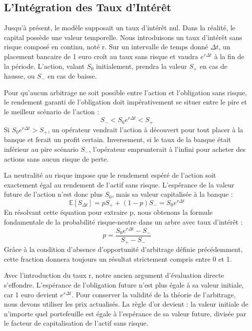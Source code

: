 \subsection{L'Intégration des Taux d'Intérêt}

Jusqu'à présent, le modèle supposait un taux d'intérêt nul. Dans la réalité, le capital possède une valeur temporelle. Nous introduisons un taux d'intérêt sans risque composé en continu, noté r. 
Sur un intervalle de temps donné $\Delta t$, un placement bancaire de 1 euro croît au taux sans risque et vaudra $e^{r\Delta t}$ à la fin de la période. 
L'action, valant $S_0$ initialement, prendra la valeur $S_+$ en cas de hausse, ou $S_-$ en cas de baisse.

Pour qu'aucun arbitrage ne soit possible entre l'action et l'obligation sans risque, le rendement garanti de l'obligation doit impérativement se situer entre le pire et le meilleur scénario de l'action :
\begin{equation}
    \label{eq:fsec3-aoa_taux}
    S_- < S_0 e^{r\Delta t} < S_+
\end{equation}
Si $S_0 e^{r\Delta t} > S_+$, un opérateur vendrait l'action à découvert pour tout placer à la banque et ferait un profit certain. Inversement, si le taux de la banque était inférieur au pire scénario $S_-$, l'opérateur emprunterait à l'infini pour acheter des actions sans aucun risque de perte.

La neutralité au risque impose que le rendement espéré de l'action soit exactement égal au rendement de l'actif sans risque. L'espérance de la valeur future de l'action n'est donc plus $S_0$, mais sa valeur capitalisée à la banque :
\begin{equation}
    \label{eq:fsec3-esperance_taux}
    \mathbb{E}[S_{\Delta t}] = p S_+ + (1-p) S_- = S_0 e^{r\Delta t}
\end{equation}
En résolvant cette équation pour extraire p, nous obtenons la formule fondamentale de la probabilité risque-neutre dans un arbre avec taux d'intérêt :
\begin{equation}
    \label{eq:fsec3-proba_rn_taux}
    p = \frac{S_0 e^{r\Delta t} - S_-}{S_+ - S_-}
\end{equation}
Grâce à la condition d'absence d'opportunité d'arbitrage définie précédemment, cette fraction donnera toujours un résultat strictement compris entre 0 et 1.

Avec l'introduction du taux r, notre ancien argument d'évaluation directe s'effondre. L'espérance de l'obligation future n'est plus égale à sa valeur initiale, car 1 euro devient $e^{r\Delta t}$. 
Pour conserver la validité de la théorie de l'arbitrage, nous devons utiliser les prix actualisés. La règle d'or devient : la valeur initiale de n'importe quel portefeuille est égale à l'espérance de sa valeur future, divisée par le facteur de capitalisation de l'actif sans risque.

